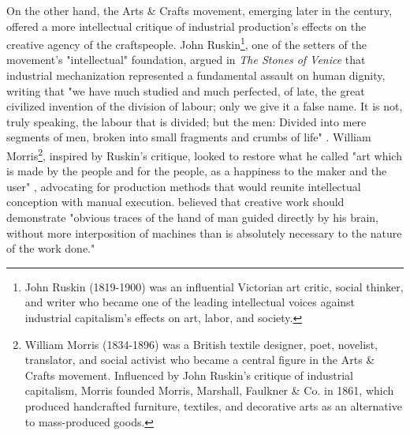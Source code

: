 On the other hand, the Arts \& Crafts movement, emerging later in the century, offered a more intellectual critique of industrial production's effects on the creative agency of the craftspeople. John Ruskin\footnote{John Ruskin (1819-1900) was an influential Victorian art critic, social thinker, and writer who became one of the leading intellectual voices against industrial capitalism's effects on art, labor, and society.}, one of the setters of the movement's "intellectual" foundation, argued in \textit{The Stones of Venice} that industrial mechanization represented a fundamental assault on human dignity, writing that "we have much studied and much perfected, of late, the great civilized invention of the division of labour; only we give it a false name. It is not, truly speaking, the labour that is divided; but the men: Divided into mere segments of men, broken into small fragments and crumbs of life" \citep{ruskin1892}. William Morris\footnote{William Morris (1834-1896) was a British textile designer, poet, novelist, translator, and social activist who became a central figure in the Arts \& Crafts movement. Influenced by John Ruskin's critique of industrial capitalism, Morris founded Morris, Marshall, Faulkner \& Co. in 1861, which produced handcrafted furniture, textiles, and decorative arts as an alternative to mass-produced goods.}, inspired by Ruskin's critique, looked to restore what he called "art which is made by the people and for the people, as a happiness to the maker and the user" \citep{freelibrary2014}, advocating for production methods that would reunite intellectual conception with manual execution. \citet{morris1882} believed that creative work should demonstrate "obvious traces of the hand of man guided directly by his brain, without more interposition of machines than is absolutely necessary to the nature of the work done."

